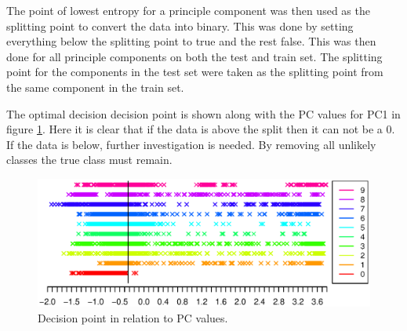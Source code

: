 The point of lowest entropy for a principle component was then used as the splitting point to convert the data into binary.
This was done by setting everything below the splitting point to true and the rest false.
This was then done for all principle components on both the test and train set. 
The splitting point for the components in the test set were taken as the splitting point from the same component in the train set.

The optimal decision decision point is shown along with the PC values for PC1 in figure \ref{fig:decision_point}. 
Here it is clear that if the data is above the split then it can not be a 0.
If the data is below, further investigation is needed.
By removing all unlikely classes the true class must remain.

\begin{figure}[H]
\includegraphics[width = \textwidth]{graphics/decision_seperation}
\caption{Decision point in relation to PC values.}
\label{fig:decision_point}
\end{figure}